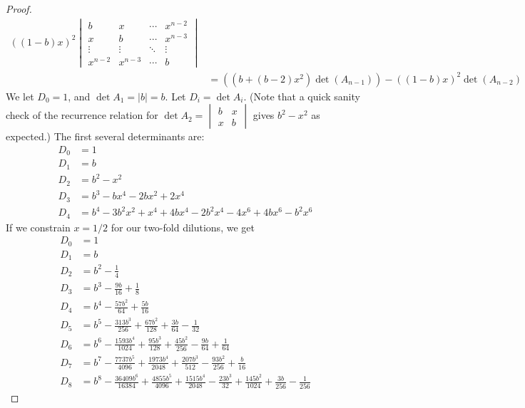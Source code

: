 \documentclass[11pt, letterpaper]{article}
\begin{document}
\begin{proof}
\begin{align*}
\left((1-b)x\right)^2 \begin{vmatrix}
b & x  & \cdots & x^{n-2} \\
x & b & \cdots & x^{n-3} \\
\vdots & \vdots & \ddots & \vdots \\
x^{n-2} & x^{n-3} & \cdots & b
\end{vmatrix} \\
& = \left(\left(b + (b-2)x^2\right) \det (A_{n-1}) \right) - 
\left((1-b)x\right)^2 \det (A_{n-2})
\end{align*}
We let $D_0 = 1$, and $\det A_1 = |b| = b$. Let $D_i = \det A_i$. (Note that a quick sanity check of the recurrence relation for $\det A_2 = \begin{vmatrix}
b & x \\ x & b
\end{vmatrix}$ gives $b^2-x^2$ as expected.) The first several determinants are:
\begin{align*}
D_0 &= 1\\
D_1 &= b\\
D_2 &= b^2 - x^2 \\
D_3 &= b^3 - bx^4 - 2bx^2 + 2x^4 \\
D_4 &= b^4 - 3 b^2 x^2 + x^4 + 4 b x^4 - 2 b^2 x^4 - 4 x^6 + 4 b x^6 - b^2 x^6
\end{align*} 
If we constrain $x = 1/2$ for our two-fold dilutions, we get
\begin{align*}
D_0 &= 1\\
D_1 &= b\\
D_2 &= b^2 - \frac{1}{4} \\
D_3 &= b^3 - \frac{9b}{16} + \frac{1}{8} \\
D_4 &= b^4 - \frac{57 b^2}{64} + \frac{5 b}{16}\\
D_5 &= b^5 - \frac{313 b^3}{256} + \frac{67 b^2}{128} + \frac{3 b}{64} - \frac{1}{32} \\
D_6 &= b^6 - \frac{1593 b^4}{1024} + \frac{95 b^3}{128} + \frac{45 b^2}{256} - \frac{9 b}{64} + \frac{1}{64}\\
D_7 &= b^7 - \frac{7737 b^5}{4096} + \frac{1973 b^4}{2048} + \frac{207 b^3}{512} - \frac{93 b^2}{256} + \frac{b}{16} \\
D_8 &= b^8 - \frac{36409 b^6}{16384} + \frac{4855 b^5}{4096} + \frac{1515 b^4}{2048} - \frac{23 b^3}{32} + \frac{145 b^2}{1024} + \frac{3 b}{256} - \frac{1}{256}
\end{align*}





\end{proof}
\end{document}
